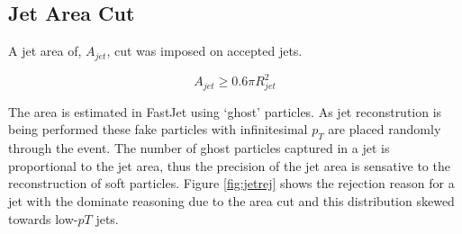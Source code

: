 

\subsection{Jet Area Cut}

A jet area of, $A_{jet}$, cut was imposed on accepted jets.

\begin{equation}
A_{jet} \geq 0.6 \pi R_{jet}^{2}
\label{eq:AreaJet}
\end{equation}

The area is estimated in FastJet using `ghost' particles.  As jet reconstrution is being performed these fake particles with infinitesimal $p_{T}$ are placed randomly through the event.  The number of ghost particles captured in a jet is proportional to the jet area, thus the precision of the jet area is sensative to the reconstruction of soft particles.  Figure \ref{fig:jetrej} shows the rejection reason for a jet with the dominate reasoning due to the area cut and this distribution skewed towards low-$p{T}$ jets.



